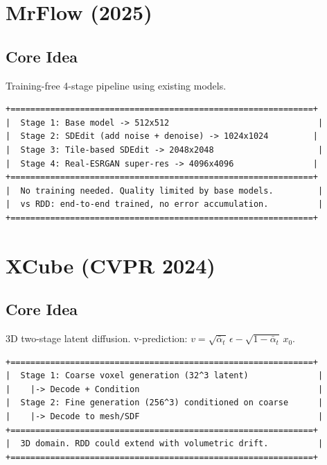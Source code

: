 \documentclass[11pt, a4paper]{article}
\newcommand{\alphabar}{\bar{\alpha}}
\begin{document}
\newpage
\section{MrFlow (2025)}

\subsection{Core Idea}
Training-free 4-stage pipeline using existing models.

\begin{lstlisting}[style=flowchart, caption={MrFlow Pipeline}]
+=============================================================+
|  Stage 1: Base model -> 512x512                              |
|  Stage 2: SDEdit (add noise + denoise) -> 1024x1024         |
|  Stage 3: Tile-based SDEdit -> 2048x2048                     |
|  Stage 4: Real-ESRGAN super-res -> 4096x4096                |
+=============================================================+
|  No training needed. Quality limited by base models.         |
|  vs RDD: end-to-end trained, no error accumulation.          |
+=============================================================+
\end{lstlisting}

\newpage
\section{XCube (CVPR 2024)}

\subsection{Core Idea}
3D two-stage latent diffusion. v-prediction: $v = \sqrt{\alphabar_t}\,\epsilon - \sqrt{1-\alphabar_t}\,x_0$.

\begin{lstlisting}[style=flowchart, caption={XCube Pipeline}]
+=============================================================+
|  Stage 1: Coarse voxel generation (32^3 latent)              |
|    |-> Decode + Condition                                    |
|  Stage 2: Fine generation (256^3) conditioned on coarse      |
|    |-> Decode to mesh/SDF                                    |
+=============================================================+
|  3D domain. RDD could extend with volumetric drift.          |
+=============================================================+
\end{lstlisting}
\end{document}
